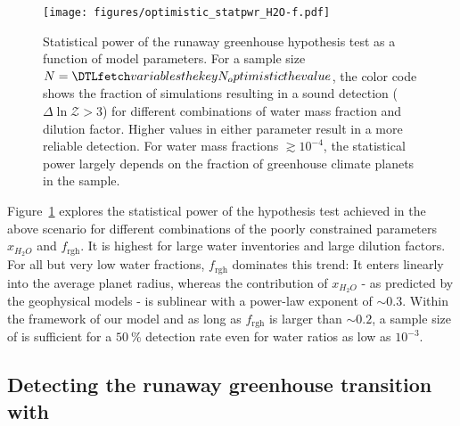 \documentclass[twocolumn,twocolappendix]{aastex631}
\begin{document}
\begin{figure}[ht!]
    \begin{centering}
        \texttt{[image: figures/optimistic\_statpwr\_H2O-f.pdf]}
        \caption{
            Statistical power of the runaway greenhouse hypothesis test as a function of model parameters.
            For a sample size $N = \var{N_optimistic}$, the color code shows the fraction of simulations resulting in a sound detection ($\Delta \ln \mathcal{Z} > 3$) for different combinations of water mass fraction and dilution factor.
            Higher values in either parameter result in a more reliable detection.
            For water mass fractions $\gtrsim 10^{-4}$, the statistical power largely depends on the fraction of greenhouse climate planets in the sample.
        }
        \label{fig:statpwr_H2O-f}
    \end{centering}
\end{figure}
Figure~\ref{fig:statpwr_H2O-f} explores the statistical power of the hypothesis test achieved in the above scenario for different combinations of the poorly constrained parameters $x_{H_2O}$ and $f_\mathrm{rgh}$.
It is highest for large water inventories and large dilution factors.
 For all but very low water fractions, $f_\mathrm{rgh}$ dominates this trend: It enters linearly into the average planet radius, whereas the contribution of $x_{H_2O}$ - as predicted by the geophysical models - is sublinear with a power-law exponent of $\sim 0.3$.
Within the framework of our model and as long as $f_\mathrm{rgh}$ is larger than $\sim 0.2$, a sample size of  is sufficient for a $\SI{50}{\percent}$ detection rate even for water ratios as low as $10^{-3}$.



\subsection{Detecting the runaway greenhouse transition with \plato}\label{sec:res_samplesize}
\end{document}
